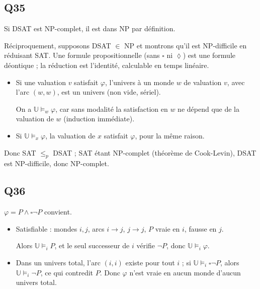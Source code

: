 \documentclass[11pt,a4paper]{article}
\providecommand{\Box}{\square}
\providecommand{\Diamond}{\lozenge}
\newcommand{\equationajustee}[1]{%
  \sbox{\boiteequation}{$\displaystyle #1$}%
  \ifdim\wd\boiteequation>\linewidth
    \[\resizebox{\linewidth}{!}{\usebox{\boiteequation}}\]%
  \else
    \[#1\]%
  \fi}
\begin{document}
\hypertarget{q35}{%
\subsection{Q35}\label{q35}}

Si DSAT est NP-complet, il est dans NP par définition.

Réciproquement, supposons DSAT \(\in\) NP et montrons qu'il est NP-difficile en réduisant SAT. Une formule propositionnelle (sans \(\Box\) ni \(\Diamond\)) est une formule déontique ; la réduction est l'identité, calculable en temps linéaire.

\begin{itemize}
\item
  Si une valuation \(v\) satisfait \(\varphi\), l'univers à un monde \(w\) de valuation \(v\), avec l'arc \((w,w)\), est un univers (non vide, sériel).

  On a \(\mathbb U\models_w\varphi\), car sans modalité la satisfaction en \(w\) ne dépend que de la valuation de \(w\) (induction immédiate).
\item
  Si \(\mathbb U\models_x\varphi\), la valuation de \(x\) satisfait \(\varphi\), pour la même raison.
\end{itemize}

Donc SAT \(\le_p\) DSAT ; SAT étant NP-complet (théorème de Cook-Levin), DSAT est NP-difficile, donc NP-complet.

\equationajustee{\boxed{\text{DSAT est NP-complet}\iff\text{DSAT}\in\text{NP}}}

\hypertarget{q36}{%
\subsection{Q36}\label{q36}}

\(\varphi=P\wedge\Box\neg P\) convient.

\begin{itemize}
\item
  Satisfiable : mondes \(i,j\), arcs \(i\to j\), \(j\to j\), \(P\) vraie en \(i\), fausse en \(j\).

  Alors \(\mathbb U\models_i P\), et le seul successeur de \(i\) vérifie \(\neg P\), donc \(\mathbb U\models_i\varphi\).
\item
  Dans un univers total, l'arc \((i,i)\) existe pour tout \(i\) ; si \(\mathbb U\models_i\Box\neg P\), alors \(\mathbb U\models_i\neg P\), ce qui contredit \(P\). Donc \(\varphi\) n'est vraie en aucun monde d'aucun univers total.
\end{itemize}
\end{document}
